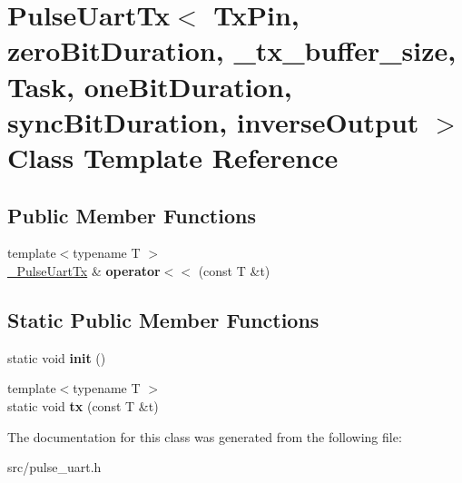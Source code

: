 \hypertarget{classPulseUartTx}{}\section{Pulse\+Uart\+Tx$<$ Tx\+Pin, zero\+Bit\+Duration, \+\_\+tx\+\_\+buffer\+\_\+size, Task, one\+Bit\+Duration, sync\+Bit\+Duration, inverse\+Output $>$ Class Template Reference}
\label{classPulseUartTx}
\subsection*{Public Member Functions}
\begin{DoxyCompactItemize}
\item 
{\footnotesize template$<$typename T $>$ }\\\hyperlink{classPulseUartTx}{\+\_\+\+Pulse\+Uart\+Tx} \& {\bfseries operator$<$$<$} (const T \&t)\hypertarget{classPulseUartTx_a591f65d2a373b53cef046a0caa09f86a}{}\label{classPulseUartTx_a591f65d2a373b53cef046a0caa09f86a}

\end{DoxyCompactItemize}
\subsection*{Static Public Member Functions}
\begin{DoxyCompactItemize}
\item 
static void {\bfseries init} ()\hypertarget{classPulseUartTx_afe1716e309086b7419aaca036f0e0c16}{}\label{classPulseUartTx_afe1716e309086b7419aaca036f0e0c16}

\item 
{\footnotesize template$<$typename T $>$ }\\static void {\bfseries tx} (const T \&t)\hypertarget{classPulseUartTx_a5a80e32bf9c301830f710d5b8d379259}{}\label{classPulseUartTx_a5a80e32bf9c301830f710d5b8d379259}

\end{DoxyCompactItemize}


The documentation for this class was generated from the following file\+:\begin{DoxyCompactItemize}
\item 
src/pulse\+\_\+uart.\+h\end{DoxyCompactItemize}
